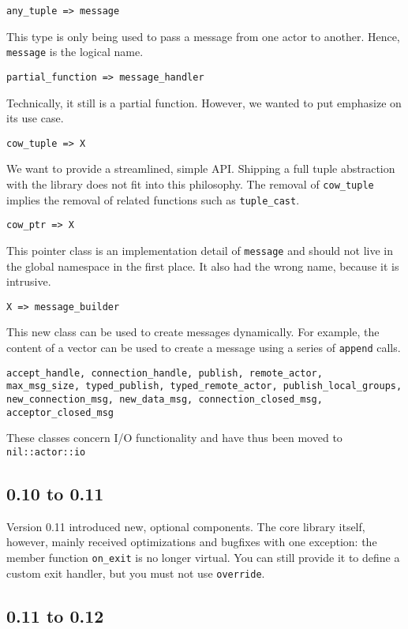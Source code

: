 \lstinline^any_tuple => message^

This type is only being used to pass a message from one actor to another.
Hence, \lstinline^message^ is the logical name.

\lstinline^partial_function => message_handler^

Technically, it still is a partial function. However, we wanted to put
emphasize on its use case.

\lstinline^cow_tuple => X^

We want to provide a streamlined, simple API. Shipping a full tuple abstraction
with the library does not fit into this philosophy. The removal of
\lstinline^cow_tuple^ implies the removal of related functions such as
\lstinline^tuple_cast^.

\lstinline^cow_ptr => X^

This pointer class is an implementation detail of \lstinline^message^ and
should not live in the global namespace in the first place. It also had the
wrong name, because it is intrusive.

\lstinline^X => message_builder^

This new class can be used to create messages dynamically. For example, the
content of a vector can be used to create a message using a series of
\lstinline^append^ calls.

\begin{lstlisting}
accept_handle, connection_handle, publish, remote_actor,
max_msg_size, typed_publish, typed_remote_actor, publish_local_groups,
new_connection_msg, new_data_msg, connection_closed_msg, acceptor_closed_msg
\end{lstlisting}

These classes concern I/O functionality and have thus been moved to
\lstinline^nil::actor::io^

\subsection{0.10 to 0.11}

Version 0.11 introduced new, optional components. The core library itself,
however, mainly received optimizations and bugfixes with one exception: the
member function \lstinline^on_exit^ is no longer virtual. You can still provide
it to define a custom exit handler, but you must not use \lstinline^override^.

\subsection{0.11 to 0.12}

